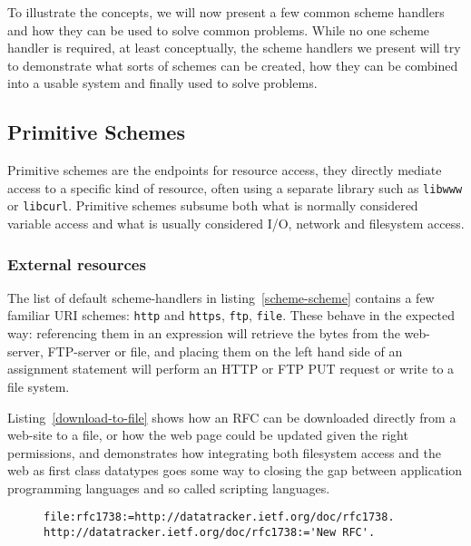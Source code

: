 \documentclass[preprint,authoryear]{llncs}
\begin{document}
To illustrate the concepts, we will now present a few common scheme handlers and how they can be
used to solve common problems.  While no one scheme handler is required, at least conceptually,
the scheme handlers we present will try to demonstrate what sorts of schemes can be created,
how they can be combined into a usable system and finally used to solve problems.

\subsection{Primitive Schemes}
\label{primitiveSchemes}

Primitive schemes are the endpoints for resource access, they directly
mediate access to a specific kind of resource, often using a separate
library such as {\tt libwww} or {\tt libcurl}.  Primitive schemes
subsume both what is normally considered variable access and 
what is usually considered I/O, network and filesystem access.


\subsubsection{External resources}
\label{externalResources}

The list of default scheme-handlers in listing~\ref{scheme-scheme} contains a few familiar URI schemes:
{\tt http} and {\tt https}, {\tt ftp}, {\tt file}.   These behave in the expected way:   referencing them in an expression will
retrieve the bytes from the web-server, FTP-server or file, and placing them on the left hand side of
an assignment statement will perform an HTTP or FTP PUT request or write to a file system. 
 
Listing~\ref{download-to-file} shows how an RFC can be downloaded directly from a web-site
to a file, or how the web page could be updated given the right permissions, and demonstrates how integrating both filesystem access and the web as first class datatypes
goes some way to closing the gap between application programming languages and so called
scripting languages.

\begin{figure}[htbp]
\begin{lstlisting}[style=numbers,label=download-to-file,caption=Downloading an RFC to a file.]
file:rfc1738:=http://datatracker.ietf.org/doc/rfc1738.
http://datatracker.ietf.org/doc/rfc1738:='New RFC'.
\end{lstlisting}
\end{figure}
\end{document}
